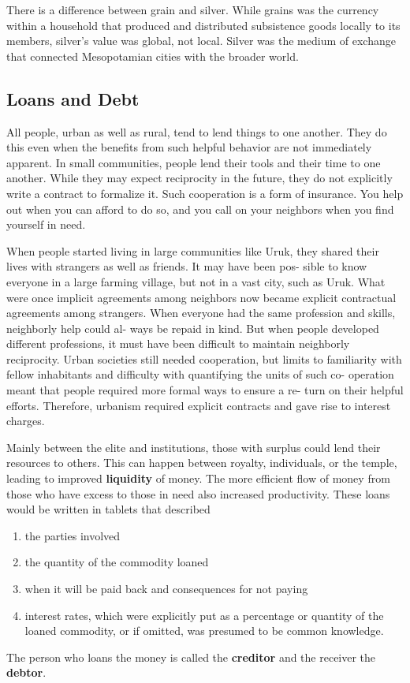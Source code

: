 \documentclass{article}
\begin{document}
    There is a difference between grain and silver. While grains was the currency within a household that produced and distributed subsistence goods locally to its members, silver's value was global, not local. Silver was the medium of exchange that connected Mesopotamian cities with the broader world. 

  \subsection{Loans and Debt}
    
    All people, urban as well as rural, tend to lend things to one another. They do this even when the benefits from such helpful behavior are not immediately apparent. In small communities, people lend their tools and their time to one another. While they may expect reciprocity in the future, they do not explicitly write a contract to formalize it. Such cooperation is a form of insurance. You help out when you can afford to do so, and you call on your neighbors when you find yourself in need.

    When people started living in large communities like Uruk, they shared their lives with strangers as well as friends. It may have been pos- sible to know everyone in a large farming village, but not in a vast city, such as Uruk. What were once implicit agreements among neighbors now became explicit contractual agreements among strangers. When everyone had the same profession and skills, neighborly help could al- ways be repaid in kind. But when people developed different professions, it must have been difficult to maintain neighborly reciprocity. Urban societies still needed cooperation, but limits to familiarity with fellow inhabitants and difficulty with quantifying the units of such co- operation meant that people required more formal ways to ensure a re- turn on their helpful efforts. Therefore, urbanism required explicit contracts and gave rise to interest charges. 
    
    \begin{finance}
      Mainly between the elite and institutions, those with surplus could lend their resources to others. This can happen between royalty, individuals, or the temple, leading to improved \textbf{liquidity} of money. The more efficient flow of money from those who have excess to those in need also increased productivity. These loans would be written in tablets that described 
      \begin{enumerate}
        \item the parties involved 
        \item the quantity of the commodity loaned 
        \item when it will be paid back and consequences for not paying
        \item interest rates, which were explicitly put as a percentage or quantity of the loaned commodity, or if omitted, was presumed to be common knowledge.
      \end{enumerate}
      The person who loans the money is called the \textbf{creditor} and the receiver the \textbf{debtor}.
    \end{finance}
\end{document}
